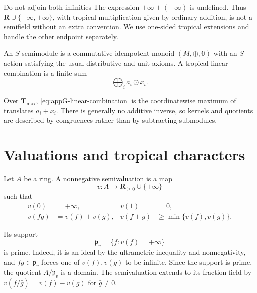 \begin{warning}{Do not adjoin both infinities}
\label{warn:appG-two-infinities}
The expression \(+\infty+(-\infty)\) is undefined.
Thus \(\mathbf R\cup\{-\infty,+\infty\}\), with tropical multiplication
given by ordinary addition, is not a semifield without an extra convention.
We use one-sided tropical extensions and handle the other endpoint
separately.
\end{warning}

\begin{definition}[Semimodule]
\label{def:appG-semimodule}
An \(S\)-semimodule is a commutative idempotent monoid
\((M,\oplus,\mathbb0)\) with an \(S\)-action satisfying the usual
distributive and unit axioms.
A tropical linear combination is a finite sum
\[
                         \bigoplus_i a_i\odot x_i.
\tag{G.5}\label{eq:appG-linear-combination}
\]
\end{definition}

Over \(\mathbf T_{\max}\), \eqref{eq:appG-linear-combination} is the
coordinatewise maximum of translates \(a_i+x_i\).
There is generally no additive inverse, so kernels and quotients are
described by congruences rather than by subtracting submodules.

\section{Valuations and tropical characters}
\label{sec:appG-valuations}

\begin{definition}
\label{def:appG-semivaluation}
Let \(A\) be a ring.
A nonnegative semivaluation is a map
\[
                      v:A\longrightarrow\mathbf R_{\geq0}\cup\{+\infty\}
\]
such that
\[
\begin{aligned}
 v(0)&=+\infty,&v(1)&=0,\\
 v(fg)&=v(f)+v(g),&
 v(f+g)&\geq\min\{v(f),v(g)\}.
\end{aligned}
\tag{G.6}\label{eq:appG-semivaluation}
\]
\end{definition}

Its support
\[
                         \mathfrak p_v=\{f:v(f)=+\infty\}
\tag{G.7}\label{eq:appG-support}
\]
is prime.
Indeed, it is an ideal by the ultrametric inequality and nonnegativity, and
\(fg\in\mathfrak p_v\) forces one of \(v(f),v(g)\) to be infinite.
Since the support is prime, the quotient \(A/\mathfrak p_v\) is a domain.
The semivaluation extends to its fraction field by
\(v(\bar f/\bar g)=v(f)-v(g)\) for \(\bar g\neq0\).

